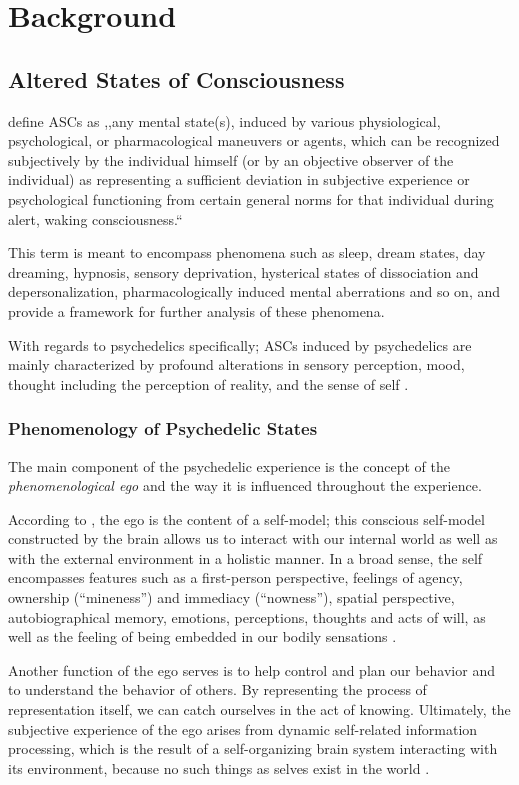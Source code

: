 \chapter{Background}

\section{Altered States of Consciousness}\label{sec:asc_definition}
\textcite{ludwig1966altered} define \acp{ASC} as ,,any mental state(s), induced by various physiological, psychological, or pharmacological maneuvers or agents, which can be recognized subjectively by the individual himself (or by an objective observer of the individual) as representing a sufficient deviation in subjective experience or psychological functioning from certain general norms for that individual during alert, waking consciousness.``

This term is meant to encompass phenomena such as sleep, dream states, day dreaming, hypnosis, sensory deprivation, hysterical states of dissociation and depersonalization, pharmacologically induced mental aberrations and so on, and provide a framework for further analysis of these phenomena.

With regards to psychedelics specifically; \acp{ASC} induced by psychedelics are mainly characterized by profound alterations in sensory perception, mood, thought including the perception of reality, and the sense of self \autocite{preller2016phenomenology}.

\subsection{Phenomenology of Psychedelic States}
The main component of the psychedelic experience is the concept of the \textit{phenomenological ego} and the way it is influenced throughout the experience.


\begin{aquote}{\autocite{preller2016phenomenology}}
    According to \textcite{metzinger2009ego}, the ego is the content of a self-model; this conscious self-model constructed by the brain allows us to interact with our internal world as well as with the external environment in a holistic manner. In a broad sense, the self encompasses features such as a first-person perspective, feelings of agency, ownership (“mineness”) and immediacy (“nowness”), spatial perspective, autobiographical memory, emotions, perceptions, thoughts and acts of will, as well as the feeling of being embedded in our bodily sensations \autocites{metzinger2009ego}{northoff2011self}.

    Another function of the ego serves is to help control and plan our behavior and to understand the behavior of others. By representing the process of representation itself, we can catch ourselves in the act of knowing. Ultimately, the subjective experience of the ego arises from dynamic self-related information processing, which is the result of a self-organizing brain system interacting with its environment, because no such things as selves exist in the world \autocite{metzinger2009ego}.
\end{aquote}

